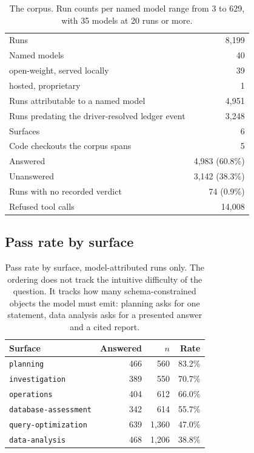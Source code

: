 \documentclass[11pt]{article}
\newcommand{\code}[1]{\texttt{\small #1}}
\begin{document}
\begin{table}[htbp]
\centering\small
\begin{tabular}{@{}lr@{}}
\toprule
Runs & 8{,}199 \\
Named models & 40 \\
\quad open-weight, served locally & 39 \\
\quad hosted, proprietary & 1 \\
Runs attributable to a named model & 4{,}951 \\
Runs predating the driver-resolved ledger event & 3{,}248 \\
Surfaces & 6 \\
Code checkouts the corpus spans & 5 \\
Answered & 4{,}983 (60.8\%) \\
Unanswered & 3{,}142 (38.3\%) \\
Runs with no recorded verdict & 74 (0.9\%) \\
Refused tool calls & 14{,}008 \\
\bottomrule
\end{tabular}
\caption{The corpus. Run counts per named model range from 3 to 629, with 35 models at 20 runs or more.}
\end{table}

\subsection{Pass rate by surface}

\begin{table}[htbp]
\centering\small
\begin{tabular}{@{}lrrr@{}}
\toprule
Surface & Answered & $n$ & Rate \\
\midrule
\code{planning} & 466 & 560 & 83.2\% \\
\code{investigation} & 389 & 550 & 70.7\% \\
\code{operations} & 404 & 612 & 66.0\% \\
\code{database-assessment} & 342 & 614 & 55.7\% \\
\code{query-optimization} & 639 & 1{,}360 & 47.0\% \\
\code{data-analysis} & 468 & 1{,}206 & 38.8\% \\
\bottomrule
\end{tabular}
\caption{Pass rate by surface, model-attributed runs only. The ordering does not track the intuitive difficulty
of the question. It tracks how many schema-constrained objects the model must emit: planning asks for one
statement, data analysis asks for a presented answer and a cited report.}
\end{table}
\end{document}
